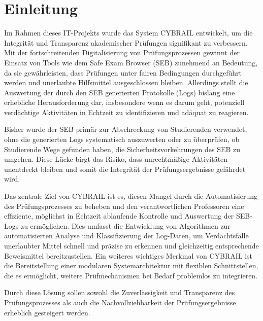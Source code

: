 \chapter{Einleitung} \label{ch:einleitung}

Im Rahmen dieses IT-Projekts wurde das System CYBRAIL entwickelt, um die Integrität und Transparenz akademischer Prüfungen signifikant zu verbessern. Mit der fortschreitenden Digitalisierung von Prüfungsprozessen gewinnt der Einsatz von Tools wie dem Safe Exam Browser (SEB) zunehmend an Bedeutung, da sie gewährleisten, dass Prüfungen unter fairen Bedingungen durchgeführt werden und unerlaubte Hilfsmittel ausgeschlossen bleiben. Allerdings stellt die Auswertung der durch den SEB generierten Protokolle (Logs) bislang eine erhebliche Herausforderung dar, insbesondere wenn es darum geht, potenziell verdächtige Aktivitäten in Echtzeit zu identifizieren und adäquat zu reagieren.

Bisher wurde der SEB primär zur Abschreckung von Studierenden verwendet, ohne die generierten Logs systematisch auszuwerten oder zu überprüfen, ob Studierende Wege gefunden haben, die Sicherheitsvorkehrungen des SEB zu umgehen. Diese Lücke birgt das Risiko, dass unrechtmäßige Aktivitäten unentdeckt bleiben und somit die Integrität der Prüfungsergebnisse gefährdet wird.

Das zentrale Ziel von CYBRAIL ist es, diesen Mangel durch die Automatisierung des Prüfungsprozesses zu beheben und den verantwortlichen Professoren eine effiziente, möglichst in Echtzeit ablaufende Kontrolle und Auswertung der SEB-Logs zu ermöglichen. Dies umfasst die Entwicklung von Algorithmen zur automatisierten Analyse und Klassifizierung der Log-Daten, um Verdachtsfälle unerlaubter Mittel schnell und präzise zu erkennen und gleichzeitig entsprechende Beweismittel bereitzustellen. Ein weiteres wichtiges Merkmal von CYBRAIL ist die Bereitstellung einer modularen Systemarchitektur mit flexiblen Schnittstellen, die es ermöglicht, weitere Prüfmechanismen bei Bedarf problemlos zu integrieren.

Durch diese Lösung sollen sowohl die Zuverlässigkeit und Transparenz des Prüfungsprozesses als auch die Nachvollziehbarkeit der Prüfungsergebnisse erheblich gesteigert werden.